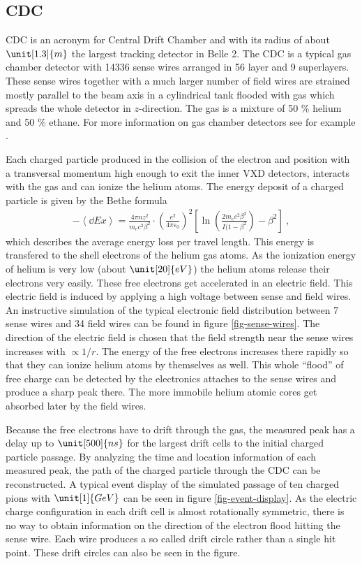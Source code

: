 \subsection{CDC}

CDC is an acronym for Central Drift Chamber and with its radius of about $\unit[1.3]{m}$ the largest tracking detector in Belle 2. The CDC is a typical gas chamber detector with 14336 sense wires arranged in 56 layer and 9 superlayers. These sense wires together with a much larger number of field wires are strained mostly parallel to the beam axis in a cylindrical tank flooded with gas which spreads the whole detector in $z$-direction. The gas is a mixture of 50 \% helium and 50 \% ethane. For more information on gas chamber detectors see for example \cite{grupen}.

Each charged particle produced in the collision of the electron and position with a transversal momentum high enough to exit the inner VXD detectors, interacts with the gas and can ionize the helium atoms. The energy deposit of a charged particle is given by the Bethe formula \cite{bethe}
\begin{align}
 - \left\langle \dd{E}{x} \right\rangle = \frac{4 \pi n z^2}{m_e c^2 \beta^2} \cdot \left( \frac{e^2}{4 \pi \varepsilon_0} \right)^2 \left[ \ln\left( \frac{2 m_e c^2 \beta^2}{I(1 - \beta^2} \right) - \beta^2 \right] \ , \label{form-bethe}
\end{align}
which describes the average energy loss per travel length. This energy is transfered to the shell electrons of the helium gas atoms. As the ionization energy of helium is very low (about $\unit[20]{eV}$) the helium atoms release their electrons very easily. These free electrons get accelerated in an electric field. This electric field is induced by applying a high voltage between sense and field wires. An instructive simulation of the typical electronic field distribution between 7 sense wires and 34 field wires can be found in figure \ref{fig-sense-wires}. The direction of the electric field is chosen that the field strength near the sense wires increases with $\propto 1/r$. The energy of the free electrons increases there rapidly so that they can ionize helium atoms by themselves as well. This whole ``flood'' of free charge can be detected by the electronics attaches to the sense wires and produce a sharp peak there. The more immobile helium atomic cores get absorbed later by the field wires. 

Because the free electrons have to drift through the gas, the measured peak has a delay up to $\unit[500]{ns}$ for the largest drift cells to the initial charged particle passage. By analyzing the time and location information of each measured peak, the path of the charged particle through the CDC can be reconstructed. A typical event display of the simulated passage of ten charged pions with $\unit[1]{GeV}$ can be seen in figure \ref{fig-event-display}. As the electric charge configuration in each drift cell is almost rotationally symmetric, there is no way to obtain information on the direction of the electron flood hitting the sense wire. Each wire produces a so called drift circle rather than a single hit point. These drift circles can also be seen in the figure.

